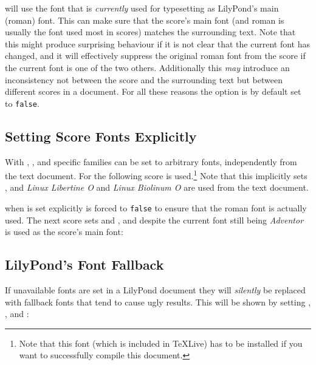 \bigskip

\sffamily {} will use the font that is
\emph{currently} used for typesetting as LilyPond's main (roman) font. This can
make sure that the score's main font (and roman is usually the font used most in
scores) matches the surrounding text. Note that this might produce surprising
behaviour if it is not clear that the current font has changed, and it will
effectively suppress the original roman font from the score if the current font
is one of the two others. Additionally this \emph{may} introduce an
inconsistency not between the score and the surrounding text but between
different scores in a document. For all these reasons the option is by default
set to \texttt{false}.

\bigskip
{}

\subsection*{Setting Score Fonts Explicitly}

With , , and  specific
families can be set to arbitrary fonts, independently from the text document.
For the following score  is
used.\footnote{Note that this font (which is included in TeXLive) has to be
installed if you want to successfully compile this document.} Note that this
implicitly sets , and \emph{Linux Libertine O} and
\emph{Linux Biolinum O} are used from the text document.

\bigskip
{}

 when  is set explicitly
 is forced to \texttt{false} to ensure that the
roman font is actually used. The next score sets  and , and despite the current font still being 
\emph{Adventor} is used as the score's main font:

\bigskip
{}

\subsection*{LilyPond's Font Fallback}

If unavailable fonts are set in a LilyPond document they will \emph{silently} be
replaced with fallback fonts that tend to cause ugly results. This will be shown
by setting , ,
and :

